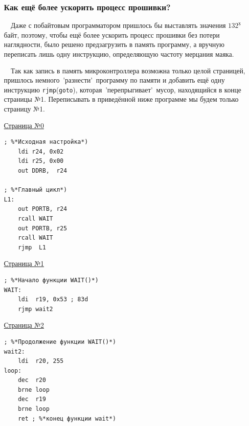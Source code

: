\documentclass[aspectratio=169, pdf, 8pt, unicode]{beamer}
\begin{document}
\begin{frame}[fragile]
\frametitle{Как ещё более ускорить процесс прошивки?}
	{
		\ \ Даже с побайтовым программатором пришлось бы выставлять значения $132^{\underline{\text{х}}}$ байт, поэтому,
		чтобы ещё более ускорить процесс прошивки без потери наглядности, было решено предзагрузить в память программу,
		а вручную переписать лишь одну инструкцию, определяющую частоту мерцания маяка.

		\ \ Так как запись в память микроконтроллера возможна только целой страницей, пришлось немного\ 'разнести'\ программу
		по памяти и добавить ещё одну инструкцию \texttt{rjmp}(\texttt{goto}), которая\ 'перепрыгивает'\ мусор, находящийся в
		конце страницы №1. Переписывать в приведённой ниже программе мы будем только страницу №1.
	}
		\noindent\makebox[\linewidth]{\rule{\paperwidth}{0.4pt}}
		\begin{minipage}[t]{.32\textwidth}
			\centering
			{ \large \underline{Страница №0} }
			\begin{lstlisting}
; %*Исходная настройка*)
    ldi r24, 0x02
    ldi r25, 0x00
    out DDRB,  r24

; %*Главный цикл*)
L1:
    out PORTB, r24
    rcall WAIT
    out PORTB, r25
    rcall WAIT
    rjmp  L1
			\end{lstlisting}
		\end{minipage}
		\begin{minipage}[t]{.32\textwidth}
			\centering
			{ \large \underline{Страница №1} }
			\begin{lstlisting}
; %*Начало функции WAIT()*)
WAIT:
    ldi  r19, 0x53 ; 83d
    rjmp wait2
			\end{lstlisting}
		\end{minipage}
		\begin{minipage}[t]{.32\textwidth}
			\centering
			{ \large \underline{Страница №2} }
			\begin{lstlisting}
; %*Продолжение функции WAIT()*)
wait2:
    ldi  r20, 255
loop:
    dec  r20
    brne loop
    dec  r19
    brne loop
    ret ; %*конец функции wait*)
			\end{lstlisting}
		\end{minipage}
\end{frame}
\end{document}
